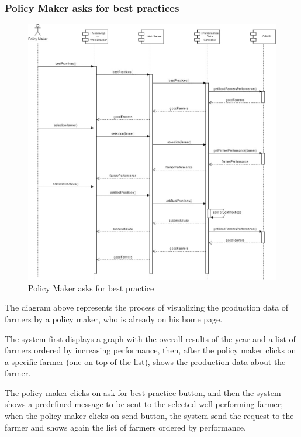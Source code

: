 \documentclass{article}
\begin{document}
    \subsubsection{Policy Maker asks for best practices}
        \begin{figure} [h]
            \centering
            \includegraphics[width=1\textwidth]{images/ArchitecturalDesign/RuntimeView/13. PolicyMakerAskBestPractice.jpg}
            \caption{\label{fig:policyMakerAskBestPractice}Policy Maker asks for best practice}
        \end{figure}
        
        The diagram above represents the process of visualizing the production data of farmers by a policy maker, who is already on his home page. \par
        The system first displays a graph with the overall results of the year and a list of farmers ordered by increasing performance, then, after the policy maker clicks on a specific farmer (one on top of the list), shows the production data about the farmer. \par
        The policy maker clicks on ask for best practice button, and then the system shows a predefined message to be sent to the selected well performing farmer; when the policy maker clicks on send button, the system send the request to the farmer and shows again the list of farmers ordered by performance.
        
\end{document}
